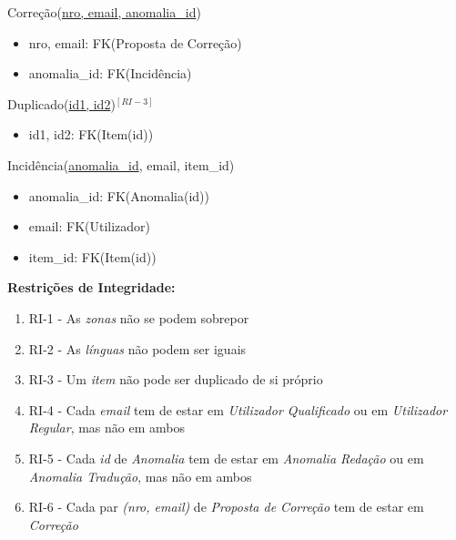 \documentclass[12pt]{report}
\begin{document}
\begin{multicols}{2}
\vspace{5mm}

Correção(\underline{nro, email, anomalia\_id})
\begin{itemize}
	\item nro, email: FK(Proposta de Correção)
	\item anomalia\_id: FK(Incidência)
\end{itemize}



Duplicado(\underline{id1, id2})$^{[RI-3]}$
    \begin{itemize}
	    \item id1, id2: FK(Item(id))
    \end{itemize}


\vspace{5mm}

Incidência(\underline{anomalia\_id}, email, item\_id)
    \begin{itemize}
	    \item anomalia\_id: FK(Anomalia(id))
	    \item email: FK(Utilizador)
	    \item item\_id: FK(Item(id))
    \end{itemize}


\vspace{5mm}

\end{multicols}

\Large
\textbf{Restrições de Integridade: }\\

\normalsize
\begin{enumerate}
    \item RI-1 - As \textit{zonas} não se podem sobrepor
    \item RI-2 - As \textit{línguas} não podem ser iguais
    \item RI-3 - Um \textit{item} não pode ser duplicado de si próprio
    \item RI-4 - Cada \textit{email} tem de estar em \textit{Utilizador Qualificado} ou em \textit{Utilizador Regular}, mas não em ambos
    \item RI-5 - Cada \textit{id} de \textit{Anomalia} tem de estar em \textit{Anomalia Redação} ou em \textit{Anomalia Tradução}, mas não em ambos
    \item RI-6 - Cada par \textit{(nro, email)} de \textit{Proposta de Correção} tem de estar em \textit{Correção}
    
\end{enumerate}
\end{document}
